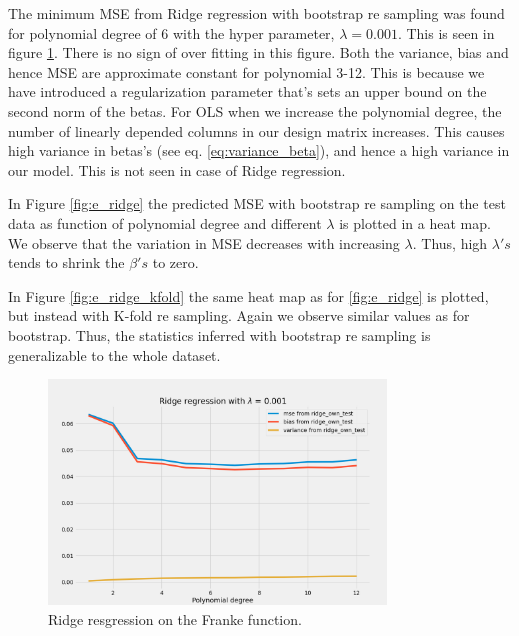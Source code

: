 
The minimum MSE from Ridge regression with bootstrap re sampling was found for polynomial degree of 6 with
the hyper parameter, $\lambda = 0.001$. This is seen in figure
\ref{fig:ridge_blabla}. There is no sign of over fitting in this figure. Both
the variance, bias and hence MSE are approximate constant for polynomial 3-12.
This is because we have introduced a regularization parameter that's sets an
upper bound on the second norm of the betas. For OLS when we increase the
polynomial degree, the number of linearly depended columns in our design matrix
increases. This causes high variance in betas's (see eq.
\ref{eq:variance_beta}), and hence a high variance in our model.  
This is not seen in case of Ridge regression.      

In Figure \ref{fig:e_ridge} the predicted MSE with bootstrap re sampling on the test data as function of
polynomial degree and different $\lambda $ is plotted in a heat map. We observe
that the variation in MSE decreases with increasing $\lambda $. Thus, high
$\lambda 's$ tends to shrink the $\beta's $ to zero.  

In Figure \ref{fig:e_ridge_kfold} the same heat map as for \ref{fig:e_ridge} is
plotted, but instead with K-fold re sampling. Again we observe similar values
as for bootstrap. Thus, the statistics inferred with bootstrap re sampling is
generalizable to the whole dataset. 




\begin{figure}[H]
    \centering
    \includegraphics[width=0.8\textwidth]{Figures/e_ridge_bias_variance_lamb_0_001.png}
    \caption{Ridge resgression on the Franke function.}
    \label{fig:ridge_blabla}
\end{figure}


